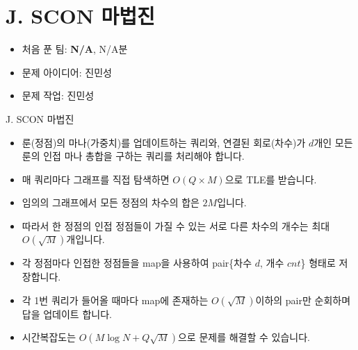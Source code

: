 \def\probno{J}
\def\probtitle{SCON 마법진}

\section{\probno{}. \probtitle{}}

\begin{frame} %
    \sectiontitle{\probno{}}{\probtitle{}}
    \begin{itemize}
        \item 처음 푼 팀: \textbf{N/A}, N/A분
        \item 문제 아이디어: 진민성
        \item 문제 작업: 진민성
    \end{itemize}
\end{frame}

\begin{frame}{\probno{}. \probtitle{}}
    \begin{itemize}
        \item 룬(정점)의 마나(가중치)를 업데이트하는 쿼리와, 연결된 회로(차수)가 $d$개인 모든 룬의 인접 마나 총합을 구하는 쿼리를 처리해야 합니다.
        \item 매 쿼리마다 그래프를 직접 탐색하면 $O(Q \times M)$으로 TLE를 받습니다.
        \item 임의의 그래프에서 모든 정점의 차수의 합은 $2M$입니다.
        \item 따라서 한 정점의 인접 정점들이 가질 수 있는 서로 다른 차수의 개수는 최대 $O(\sqrt{M})$개입니다.
        \item 각 정점마다 인접한 정점들을 map을 사용하여 pair\{차수 $d$, 개수 $cnt$\} 형태로 저장합니다.
        \item 각 1번 쿼리가 들어올 때마다 map에 존재하는 $O(\sqrt{M})$이하의 pair만 순회하며 답을 업데이트 합니다.
        \item 시간복잡도는 $O(M\log{N} + Q\sqrt{M})$으로 문제를 해결할 수 있습니다.
    \end{itemize}
\end{frame}